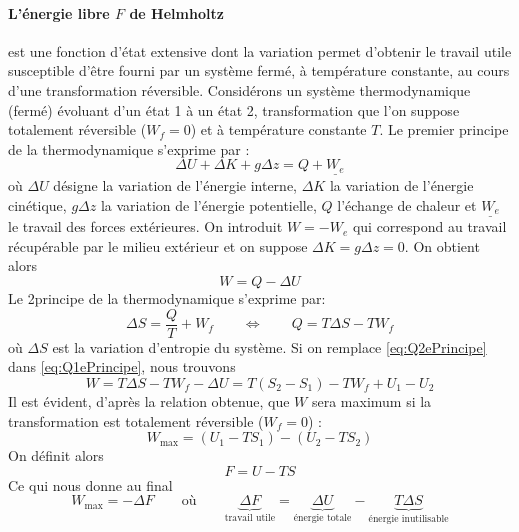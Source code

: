 \iffalse %
\paragraph{L'énergie libre $F$ de Helmholtz} est une fonction d'état extensive dont la variation permet d'obtenir le travail utile susceptible d'être fourni par un système fermé, à température constante, au cours d'une transformation réversible. 
Considérons un système thermodynamique (fermé) évoluant d'un état 1 à un état 2, transformation que l'on suppose totalement réversible ($W_f = 0$) et à température constante $T$. Le premier principe de la thermodynamique s'exprime par :
\begin{equation} \Delta U + \Delta K + g\Delta z = Q + \underline{W_e} \end{equation}
où $\Delta U$ désigne la variation de l'énergie interne, $\Delta K$ la variation de l'énergie cinétique, $g\Delta z$ la variation de l'énergie potentielle, $Q$ l'échange de chaleur et $\underline{W_e}$ le travail des forces extérieures. On introduit $W = -W_e$ qui correspond au travail récupérable par le milieu extérieur et on suppose $\Delta K = g\Delta z = 0$. On obtient alors
\begin{equation} W = Q - \Delta U \label{eq:Q1ePrincipe}\end{equation}
Le 2\ieme principe de la thermodynamique s'exprime par:
\begin{equation} \Delta S = \frac{Q}{T} + W_f \qquad\Leftrightarrow\qquad Q = T\Delta S - TW_f \label{eq:Q2ePrincipe}\end{equation}
où $\Delta S$ est la variation d'entropie du système. Si on remplace \ref{eq:Q2ePrincipe} dans \ref{eq:Q1ePrincipe}, nous trouvons
\begin{equation} W = T\Delta S - TW_f - \Delta U = T(S_2 - S_1) - TW_f + U_1 - U_2 \end{equation}
Il est évident, d'après la relation obtenue, que $W$ sera maximum si la transformation est totalement réversible ($W_f = 0$) :
\begin{equation} W_\text{max} = (U_1 - TS_1)-(U_2-TS_2)\end{equation}
On définit alors 
\begin{equation} F = U - TS \end{equation} 
Ce qui nous donne au final 
\begin{equation} W_\text{max} = -\Delta F \qquad\text{où}\qquad \underbrace{\Delta F}_\text{travail utile} = \underbrace{\Delta U}_\text{énergie totale} - \underbrace{T\Delta S}_\text{énergie inutilisable}\end{equation}

